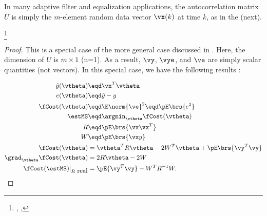 In many adaptive filter and equalization applications,
the autocorrelation matrix $U$ is simply the $m$-element
random data vector $\vx(k)$ at time $k$, as in the  (next).
\begin{corollary}
\footnote{
  ,
  ,
  }
\end{corollary}
\begin{proof}
This is a special case of the more general case discussed
in .
Here, the dimension of $U$ is $m\times1$ (n=1).
As a result,
$\vy$, $\vye$, and $\ve$ are simply scalar quantities (not vectors).
In this special case, we have the following results
:

\begin{align*}
   \hat{y}(\vtheta)   &\eqd \vx^T \vtheta    \\
   e(\vtheta)    &\eqd \hat{y}-y \\
   \fCost(\vtheta) &\eqd \E\norm{\ve}^2 \eqd \pE\brs{e^2} \\
   \estMS      &\eqd \argmin_\vtheta \fCost(\vtheta)  \\
   R           &\eqd \pE\brs{\vx\vx^T}   \\
   W           &\eqd \pE\brs{ \vx y }    \\
    \fCost(\vtheta)                     &= \vtheta^T R \vtheta -2W^T\vtheta  + \pE\brs{\vy^T\vy} \\
    \grad_\vtheta \fCost(\vtheta)           &= 2R\vtheta - 2W  \\
    \fCost(\estMS)|_{R\mbox{ real}} &=    \pE{\vy^T\vy} - W^T R^{-1}W.
\end{align*}
\end{proof}

